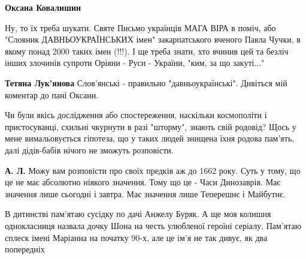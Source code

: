 \begin{itemize}
\begin{itemize}
\textbf{Оксана Ковалишин}

Ну, то їх треба шукати. Святе Письмо українців МАГА ВІРА в поміч, або "Словник
ДАВНЬОУКРАЇНСЬКИХ імен" закарпатського вченого Павла Чучки, в якому понад 2000
таких імен (!!!). І ще треба знати, хто вчинив цей та безліч інших злочинів
супроти Оріяни - Руси - України, "ким, за що закуті..."


 
\textbf{Тетяна Лук'янова}
Слов'янські - правильно "давньоукраїнські". Дивіться мій коментар до
пані Оксани.
\end{itemize}

 

Чи були якісь дослідження або спостереження, наскільки космополіти і
пристосуванці, схильні чкурнути в разі "шторму", знають свій родовід? Щось у
мене вимальовується гіпотеза, що у таких людей знищена їхня родова пам'ять,
далі дідів-бабів нічого не зможуть розповісти.

\begin{itemize}
 
\textbf{А. Л.} Можу вам розповісти про своїх предків аж до 1662 року. Суть у
тому, що це не має абсолютно ніякого значення. Тому що це - Часи Динозаврів.
Має значення лише сьогодні і завтра. Має значення лише Теперешнє і Майбутнє.
\end{itemize}

 

В дитинстві пам'ятаю сусідку по дачі Анжелу Буряк. А ще моя колишня
однокласниця назвала дочку Шона на честь улюбленої героїні серіалу. Пам'ятаю
сплеск імені Маріанна на початку 90-х, але це ім'я не так дивує, як два
попередніх \Smiley[1.0][yellow]


\end{itemize}
